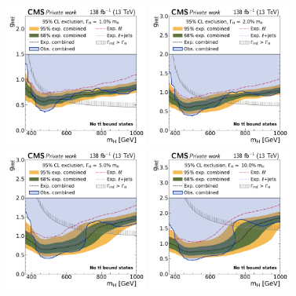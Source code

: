 \begin{figure}[!ph]
    \centering
    \includegraphics[width=0.42\textwidth]{figures/ah/limits_combined/smtt/H_limit_w1p0_g-scan.pdf}%
    \hspace*{0.05\textwidth}%
    \includegraphics[width=0.42\textwidth]{figures/ah/limits_combined/smtt/H_limit_w2p0_g-scan.pdf} \\
    \includegraphics[width=0.42\textwidth]{figures/ah/limits_combined/smtt/H_limit_w5p0_g-scan.pdf}%
    \hspace*{0.05\textwidth}%
    \includegraphics[width=0.42\textwidth]{figures/ah/limits_combined/smtt/H_limit_w10p0_g-scan.pdf}

\end{figure}
